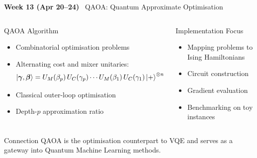 \documentclass[aspectratio=169,10pt]{beamer}
\newcommand{\week}[1]{\textcolor{blue!60!black}{\textbf{#1}}}
\begin{document}
\begin{frame}{\week{Week 13 (Apr 20--24)} \ QAOA: Quantum Approximate Optimisation}
  \begin{columns}[T]
      \begin{block}{QAOA Algorithm}
        \begin{itemize}
          \item Combinatorial optimisation problems
          \item Alternating cost and mixer unitaries:
                \[
                  \ket{\bm\gamma,\bm\beta}
                  = U_M(\beta_p)\,U_C(\gamma_p)\cdots
                    U_M(\beta_1)\,U_C(\gamma_1)\ket{+}^{\otimes n}
                \]
          \item Classical outer-loop optimisation
          \item Depth-$p$ approximation ratio
        \end{itemize}
      \end{block}
      \begin{block}{Implementation Focus}
        \begin{itemize}
          \item Mapping problems to Ising Hamiltonians
          \item Circuit construction
          \item Gradient evaluation
          \item Benchmarking on toy instances
        \end{itemize}
      \end{block}
  \end{columns}
  \vspace{4pt}
  \begin{alertblock}{Connection}
    QAOA is the optimisation counterpart to VQE and serves as
    a gateway into Quantum Machine Learning methods.
  \end{alertblock}
\end{frame}
\end{document}
